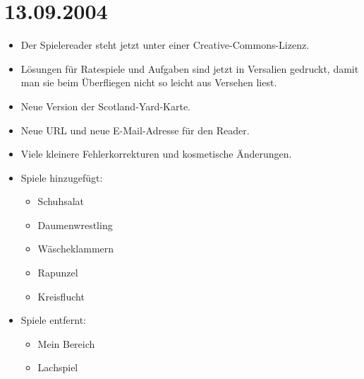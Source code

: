 \section*{13.09.2004}
\begin{itemize}
  \item Der Spielereader steht jetzt unter einer Creative-Commons-Lizenz.
  \item Lösungen für Ratespiele und Aufgaben sind jetzt in Versalien gedruckt, damit man sie beim Überfliegen nicht so leicht aus Versehen liest.
  \item Neue Version der Scotland-Yard-Karte.
  \item Neue URL und neue E-Mail-Adresse für den Reader.
  \item Viele kleinere Fehlerkorrekturen und kosmetische Änderungen.
  \item Spiele hinzugefügt:
  \begin{itemize}
    \item Schuhsalat
    \item Daumenwrestling
    \item Wäscheklammern
    \item Rapunzel
    \item Kreisflucht
  \end{itemize}
  \item Spiele entfernt:
  \begin{itemize}
    \item Mein Bereich
    \item Lachspiel
  \end{itemize}
\end{itemize}
